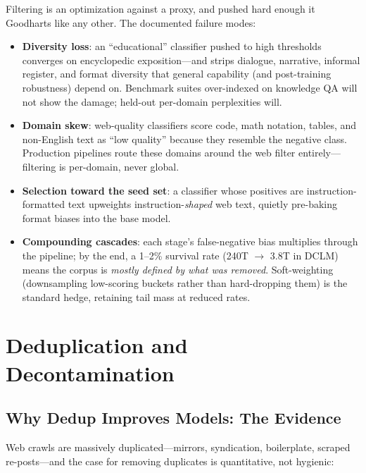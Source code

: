 \begin{warningbox}
Filtering is an optimization against a proxy, and pushed hard enough it Goodharts like any other. The documented failure modes:
\begin{itemize}
    \item \textbf{Diversity loss}: an ``educational'' classifier pushed to high thresholds converges on encyclopedic exposition---and strips dialogue, narrative, informal register, and format diversity that general capability (and post-training robustness) depend on. Benchmark suites over-indexed on knowledge QA will not show the damage; held-out per-domain perplexities will.
    \item \textbf{Domain skew}: web-quality classifiers score code, math notation, tables, and non-English text as ``low quality'' because they resemble the negative class. Production pipelines route these domains around the web filter entirely---filtering is per-domain, never global.
    \item \textbf{Selection toward the seed set}: a classifier whose positives are instruction-formatted text upweights instruction-\textit{shaped} web text, quietly pre-baking format biases into the base model.
    \item \textbf{Compounding cascades}: each stage's false-negative bias multiplies through the pipeline; by the end, a 1--2\% survival rate (240T $\rightarrow$ 3.8T in DCLM) means the corpus is \textit{mostly defined by what was removed}. Soft-weighting (downsampling low-scoring buckets rather than hard-dropping them) is the standard hedge, retaining tail mass at reduced rates.
\end{itemize}
\end{warningbox}

\section{Deduplication and Decontamination}
\label{sec:pretrain_dedup}

\subsection{Why Dedup Improves Models: The Evidence}

Web crawls are massively duplicated---mirrors, syndication, boilerplate, scraped re-posts---and the case for removing duplicates is quantitative, not hygienic:

